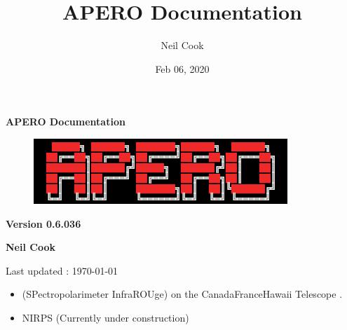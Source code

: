 \documentclass[a4paper,10pt,english]{report}
\title{APERO Documentation}
\date{Feb 06, 2020}
\author{Neil Cook}
\begin{document}
\pagestyle{empty}


        \begin{titlepage}
            \centering

            \vspace*{40mm} %
            \textbf{\Huge {APERO Documentation}}

            \vspace{5mm}
            \begin{figure}[!h]
                \centering
                \includegraphics[scale=1]{apero_logo.png}
            \end{figure}
            
            \vspace{5mm}
            \Large \textbf{Version 0.6.036}
            
            \vspace{5mm}
            \Large \textbf{{Neil Cook}}

            \vspace*{0mm}
            \small  Last updated : \MonthYearFormat\today


        \end{titlepage}

        \clearpage
        \tableofcontents

        
\pagestyle{plain}
 
\pagestyle{normal}
\label{\detokenize{index::doc}}

\begin{itemize}
\item {} 
 (SPectropolarimeter InfraROUge) on the Canada\sphinxhyphen{}France\sphinxhyphen{}Hawaii Telescope .

\item {} 
NIRPS (Currently under construction)

\end{itemize}
\end{document}
